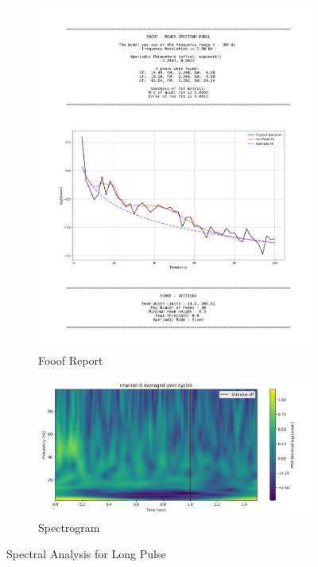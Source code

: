 \documentclass[12pt, letterpaper]{article}
\begin{document}
\begin{figure}[H]
    \centering
    \begin{subfigure}{.75\textwidth}
      \centering
      \includegraphics[width=\textwidth]{output/long-psd}
      \caption{Fooof Report}
      \label{fig:long-psd}
    \end{subfigure}
    \begin{subfigure}{.75\textwidth}
      \centering
      \includegraphics[width=\textwidth]{output/long-spectrogram}
      \caption{Spectrogram}
      \label{fig:long-spectrogram}
    \end{subfigure}
    \caption{Spectral Analysis for Long Pulse}
\end{figure}


\end{document}

